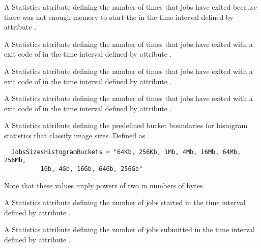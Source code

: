 \begin{description}
\item[\AdAttr{JobsShadowNoMemory}:]  A Statistics attribute defining
  the number of times that jobs have exited 
  because there was not enough memory to start the 
  in the time interval defined by attribute .

\item[\AdAttr{JobsShouldHold}:]  A Statistics attribute defining
  the number of times that jobs 
  have exited with a  exit code of 
  in the time interval defined by attribute .

\item[\AdAttr{JobsShouldRemove}:]  A Statistics attribute defining
  the number of times that jobs 
  have exited with a  exit code of 
  in the time interval defined by attribute .

\item[\AdAttr{JobsShouldRequeue}:]  A Statistics attribute defining
  the number of times that jobs 
  have exited with a  exit code of 
  in the time interval defined by attribute .

\item[\AdAttr{JobsSizesHistogramBuckets}:] A Statistics attribute defining
  the predefined bucket boundaries for histogram statistics that
  classify image sizes.
  Defined as
\footnotesize
\begin{verbatim}
  JobsSizesHistogramBuckets = "64Kb, 256Kb, 1Mb, 4Mb, 16Mb, 64Mb, 256Mb,
          1Gb, 4Gb, 16Gb, 64Gb, 256Gb"
\end{verbatim}
\normalsize
  Note that these values imply powers of two in numbers of bytes.

\item[\AdAttr{JobsStarted}:] A Statistics attribute defining
  the number of jobs started
  in the time interval defined by attribute .

\item[\AdAttr{JobsSubmitted}:] A Statistics attribute defining
  the number of jobs submitted
  in the time interval defined by attribute .


\end{description}
